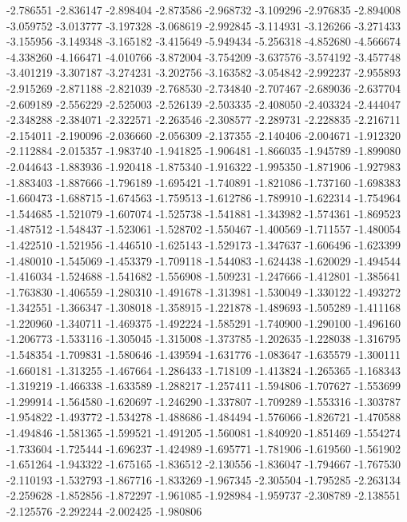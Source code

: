 -2.786551
-2.836147
-2.898404
-2.873586
-2.968732
-3.109296
-2.976835
-2.894008
-3.059752
-3.013777
-3.197328
-3.068619
-2.992845
-3.114931
-3.126266
-3.271433
-3.155956
-3.149348
-3.165182
-3.415649
-5.949434
-5.256318
-4.852680
-4.566674
-4.338260
-4.166471
-4.010766
-3.872004
-3.754209
-3.637576
-3.574192
-3.457748
-3.401219
-3.307187
-3.274231
-3.202756
-3.163582
-3.054842
-2.992237
-2.955893
-2.915269
-2.871188
-2.821039
-2.768530
-2.734840
-2.707467
-2.689036
-2.637704
-2.609189
-2.556229
-2.525003
-2.526139
-2.503335
-2.408050
-2.403324
-2.444047
-2.348288
-2.384071
-2.322571
-2.263546
-2.308577
-2.289731
-2.228835
-2.216711
-2.154011
-2.190096
-2.036660
-2.056309
-2.137355
-2.140406
-2.004671
-1.912320
-2.112884
-2.015357
-1.983740
-1.941825
-1.906481
-1.866035
-1.945789
-1.899080
-2.044643
-1.883936
-1.920418
-1.875340
-1.916322
-1.995350
-1.871906
-1.927983
-1.883403
-1.887666
-1.796189
-1.695421
-1.740891
-1.821086
-1.737160
-1.698383
-1.660473
-1.688715
-1.674563
-1.759513
-1.612786
-1.789910
-1.622314
-1.754964
-1.544685
-1.521079
-1.607074
-1.525738
-1.541881
-1.343982
-1.574361
-1.869523
-1.487512
-1.548437
-1.523061
-1.528702
-1.550467
-1.400569
-1.711557
-1.480054
-1.422510
-1.521956
-1.446510
-1.625143
-1.529173
-1.347637
-1.606496
-1.623399
-1.480010
-1.545069
-1.453379
-1.709118
-1.544083
-1.624438
-1.620029
-1.494544
-1.416034
-1.524688
-1.541682
-1.556908
-1.509231
-1.247666
-1.412801
-1.385641
-1.763830
-1.406559
-1.280310
-1.491678
-1.313981
-1.530049
-1.330122
-1.493272
-1.342551
-1.366347
-1.308018
-1.358915
-1.221878
-1.489693
-1.505289
-1.411168
-1.220960
-1.340711
-1.469375
-1.492224
-1.585291
-1.740900
-1.290100
-1.496160
-1.206773
-1.533116
-1.305045
-1.315008
-1.373785
-1.202635
-1.228038
-1.316795
-1.548354
-1.709831
-1.580646
-1.439594
-1.631776
-1.083647
-1.635579
-1.300111
-1.660181
-1.313255
-1.467664
-1.286433
-1.718109
-1.413824
-1.265365
-1.168343
-1.319219
-1.466338
-1.633589
-1.288217
-1.257411
-1.594806
-1.707627
-1.553699
-1.299914
-1.564580
-1.620697
-1.246290
-1.337807
-1.709289
-1.553316
-1.303787
-1.954822
-1.493772
-1.534278
-1.488686
-1.484494
-1.576066
-1.826721
-1.470588
-1.494846
-1.581365
-1.599521
-1.491205
-1.560081
-1.840920
-1.851469
-1.554274
-1.733604
-1.725444
-1.696237
-1.424989
-1.695771
-1.781906
-1.619560
-1.561902
-1.651264
-1.943322
-1.675165
-1.836512
-2.130556
-1.836047
-1.794667
-1.767530
-2.110193
-1.532793
-1.867716
-1.833269
-1.967345
-2.305504
-1.795285
-2.263134
-2.259628
-1.852856
-1.872297
-1.961085
-1.928984
-1.959737
-2.308789
-2.138551
-2.125576
-2.292244
-2.002425
-1.980806

